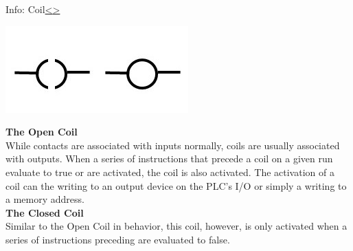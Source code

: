 \documentclass[12pt]{extarticle}
\newenvironment{instructionblock}{\Large\bgroup}{\egroup}
\newcounter{next}
\newcounter{prev}
\begin{document}
\pagebreak
{}
\begin{slide}{Info: Coil}{\hyperref[slide \theprev]{\textless}\hyperref[slide \thenext]{\textgreater}}
\begin{instructionblock}
	\begin{center}
		\includegraphics[scale=2.2]{Images/LadderDiagram03.JPG}
	\end{center}
\end{instructionblock}
\end{slide}
\vfill
\noindent
\textbf{The Open Coil}\\
While contacts are associated with inputs normally, coils are usually associated with outputs. When a series of instructions that precede a coil on a given run evaluate to true or are activated, the coil is also activated. The activation of a coil can the writing to an output device on the PLC's I/O or simply a writing to a memory address. \cite{OP_plcs}\\
\textbf{The Closed Coil}\\
Similar to the Open Coil in behavior, this coil, however, is only activated when a series of instructions preceding are evaluated to false. \cite{OP_plcs} \\

\end{document}
